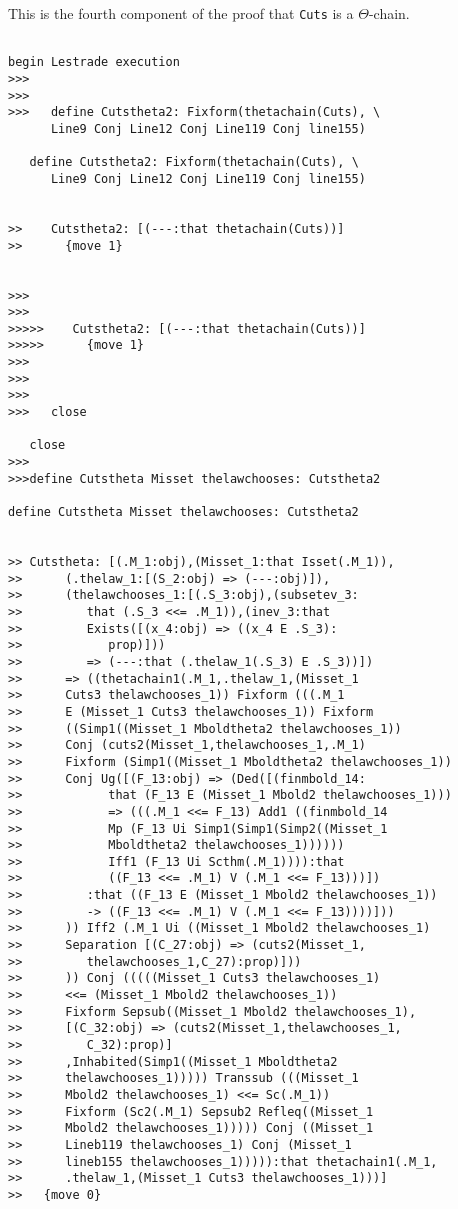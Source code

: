 \documentclass[12pt]{article}
\begin{document}
This is the fourth component of the proof that {\tt Cuts} is a $\Theta$-chain.

\begin{verbatim}

begin Lestrade execution
>>>
>>>
>>>   define Cutstheta2: Fixform(thetachain(Cuts), \
      Line9 Conj Line12 Conj Line119 Conj line155)

   define Cutstheta2: Fixform(thetachain(Cuts), \
      Line9 Conj Line12 Conj Line119 Conj line155)


>>    Cutstheta2: [(---:that thetachain(Cuts))]
>>      {move 1}


>>>
>>>
>>>>>    Cutstheta2: [(---:that thetachain(Cuts))]
>>>>>      {move 1}
>>>
>>>
>>>
>>>   close

   close
>>>
>>>define Cutstheta Misset thelawchooses: Cutstheta2

define Cutstheta Misset thelawchooses: Cutstheta2


>> Cutstheta: [(.M_1:obj),(Misset_1:that Isset(.M_1)),
>>      (.thelaw_1:[(S_2:obj) => (---:obj)]),
>>      (thelawchooses_1:[(.S_3:obj),(subsetev_3:
>>         that (.S_3 <<= .M_1)),(inev_3:that
>>         Exists([(x_4:obj) => ((x_4 E .S_3):
>>            prop)]))
>>         => (---:that (.thelaw_1(.S_3) E .S_3))])
>>      => ((thetachain1(.M_1,.thelaw_1,(Misset_1
>>      Cuts3 thelawchooses_1)) Fixform (((.M_1
>>      E (Misset_1 Cuts3 thelawchooses_1)) Fixform
>>      ((Simp1((Misset_1 Mboldtheta2 thelawchooses_1))
>>      Conj (cuts2(Misset_1,thelawchooses_1,.M_1)
>>      Fixform (Simp1((Misset_1 Mboldtheta2 thelawchooses_1))
>>      Conj Ug([(F_13:obj) => (Ded([(finmbold_14:
>>            that (F_13 E (Misset_1 Mbold2 thelawchooses_1)))
>>            => (((.M_1 <<= F_13) Add1 ((finmbold_14
>>            Mp (F_13 Ui Simp1(Simp1(Simp2((Misset_1
>>            Mboldtheta2 thelawchooses_1))))))
>>            Iff1 (F_13 Ui Scthm(.M_1)))):that
>>            ((F_13 <<= .M_1) V (.M_1 <<= F_13)))])
>>         :that ((F_13 E (Misset_1 Mbold2 thelawchooses_1))
>>         -> ((F_13 <<= .M_1) V (.M_1 <<= F_13))))]))
>>      )) Iff2 (.M_1 Ui ((Misset_1 Mbold2 thelawchooses_1)
>>      Separation [(C_27:obj) => (cuts2(Misset_1,
>>         thelawchooses_1,C_27):prop)]))
>>      )) Conj (((((Misset_1 Cuts3 thelawchooses_1)
>>      <<= (Misset_1 Mbold2 thelawchooses_1))
>>      Fixform Sepsub((Misset_1 Mbold2 thelawchooses_1),
>>      [(C_32:obj) => (cuts2(Misset_1,thelawchooses_1,
>>         C_32):prop)]
>>      ,Inhabited(Simp1((Misset_1 Mboldtheta2
>>      thelawchooses_1))))) Transsub (((Misset_1
>>      Mbold2 thelawchooses_1) <<= Sc(.M_1))
>>      Fixform (Sc2(.M_1) Sepsub2 Refleq((Misset_1
>>      Mbold2 thelawchooses_1))))) Conj ((Misset_1
>>      Lineb119 thelawchooses_1) Conj (Misset_1
>>      lineb155 thelawchooses_1))))):that thetachain1(.M_1,
>>      .thelaw_1,(Misset_1 Cuts3 thelawchooses_1)))]
>>   {move 0}



\end{verbatim}
\end{document}
